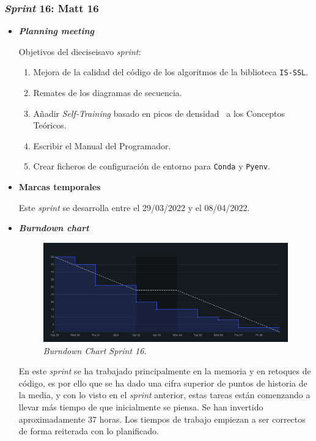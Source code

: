 \subsubsection{\textit{Sprint} 16: Matt 16}
\begin{itemize}
\item \textbf{\textit{Planning meeting}}

Objetivos del dieciseisavo \textit{sprint}:
\begin{enumerate}
\item Mejora de la calidad del código de los algoritmos de la biblioteca \texttt{IS-SSL}.
\item Remates de los diagramas de secuencia.
\item Añadir \textit{Self-Training} basado en picos de densidad~\cite{WU2018180} a los Conceptos Teóricos.
\item Escribir el Manual del Programador.
\item Crear ficheros de configuración de entorno para \texttt{Conda} y \texttt{Pyenv}.
\end{enumerate}
\item \textbf{Marcas temporales}

Este \textit{sprint} se desarrolla entre el 29/03/2022 y el 08/04/2022.

\item \textbf{\textit{Burndown chart}}
\begin{figure}
\begin{center}
\includegraphics[width=\textwidth]{../img/anexos/sprints/BD-Sprint16}
\caption{\textit{Burndown Chart Sprint 16.}}\label{fig:BD-Sprint16}
\end{center}
\end{figure}

En este \textit{sprint} se ha trabajado principalmente en la memoria y en retoques de código, es por ello que se ha dado una cifra superior de puntos de historia de la media, y con lo visto en el \textit{sprint} anterior, estas tareas están comenzando a llevar más tiempo de que inicialmente se piensa. Se han invertido aproximadamente 37 horas. Los tiempos de trabajo empiezan a ser correctos de forma reiterada con lo planificado.


\end{itemize}

